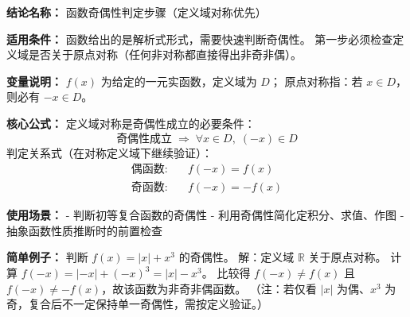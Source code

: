 \textbf{结论名称：} 函数奇偶性判定步骤（定义域对称优先）

\textbf{适用条件：}
函数给出的是解析式形式，需要快速判断奇偶性。
第一步必须检查定义域是否关于原点对称（任何非对称都直接得出非奇非偶）。

\textbf{变量说明：}
\( f(x) \) 为给定的一元实函数，定义域为 \( D \)；
原点对称指：若 \( x \in D \)，则必有 \( -x \in D \)。

\textbf{核心公式：}
定义域对称是奇偶性成立的必要条件：
\[
\boxed{\text{奇偶性成立} \;\Longrightarrow\; \forall x \in D,\; (-x) \in D}
\]
判定关系式（在对称定义域下继续验证）：
\[
\boxed{
\begin{aligned}
\text{偶函数:}&\quad f(-x) = f(x) \\
\text{奇函数:}&\quad f(-x) = -f(x)
\end{aligned}
}
\]

\textbf{使用场景：}
- 判断初等复合函数的奇偶性
- 利用奇偶性简化定积分、求值、作图
- 抽象函数性质推断时的前置检查

\textbf{简单例子：}
判断 \( f(x) = |x| + x^3 \) 的奇偶性。
解：定义域 \( \mathbb{R} \) 关于原点对称。
计算 \( f(-x) = |-x| + (-x)^3 = |x| - x^3 \)。
比较得 \( f(-x) \neq f(x) \) 且 \( f(-x) \neq -f(x) \)，故该函数为非奇非偶函数。
（注：若仅看 \( |x| \) 为偶、\( x^3 \) 为奇，复合后不一定保持单一奇偶性，需按定义验证。）